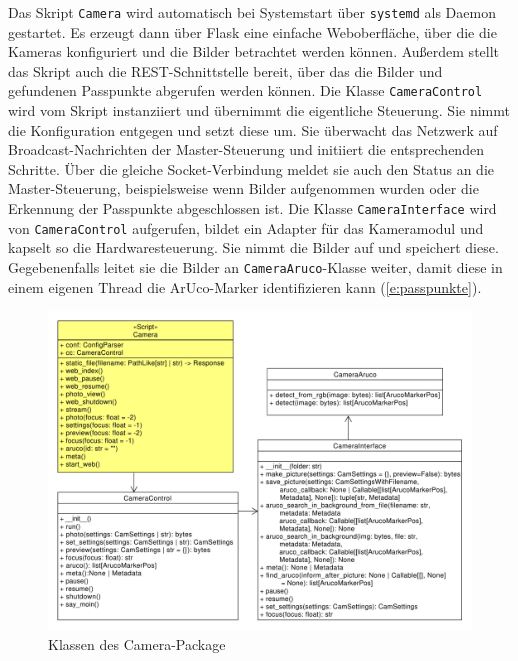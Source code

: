 \documentclass[./00PhotoBox.tex]{subfiles}
\begin{document}
Das Skript \texttt{Camera} wird automatisch bei Systemstart über \texttt{systemd} als Daemon gestartet. Es erzeugt dann über Flask eine einfache Weboberfläche, über die die Kameras konfiguriert und die Bilder betrachtet werden können. Außerdem stellt das Skript auch die \Gls{REST}-Schnittstelle bereit, über das die Bilder und gefundenen Passpunkte abgerufen werden können. Die Klasse \texttt{CameraControl} wird vom Skript instanziiert und übernimmt die eigentliche Steuerung. Sie nimmt die Konfiguration entgegen und setzt diese um. Sie überwacht das Netzwerk auf Broadcast-Nachrichten der Master-Steuerung und initiiert die entsprechenden Schritte.  Über die gleiche \Gls{Socket}-Verbindung meldet sie auch den Status an die Master-Steuerung, beispielsweise wenn Bilder aufgenommen wurden oder die Erkennung der Passpunkte abgeschlossen ist. Die Klasse \texttt{CameraInterface} wird von \texttt{CameraControl} aufgerufen, bildet ein Adapter für das Kameramodul und kapselt so die Hardwaresteuerung. Sie nimmt die Bilder auf und speichert diese. Gegebenenfalls leitet sie die Bilder an \texttt{CameraAruco}-Klasse weiter, damit diese in einem eigenen Thread die ArUco-Marker identifizieren kann (\autoref{e:passpunkte}).

\begin{figure}
    \centering
    \includegraphics[width=1\textwidth]{./img/uml/uml_camera_classdiagramm.pdf}
    \caption{Klassen des Camera-Package}
    \label{img:uml_camera}
\end{figure}
\end{document}
